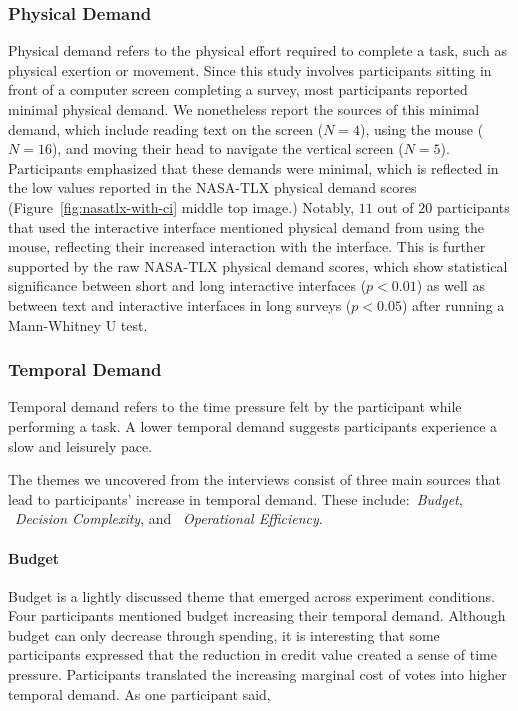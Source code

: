 \subsubsection{Physical Demand} Physical demand refers to the physical effort required to complete a task, such as physical exertion or movement. Since this study involves participants sitting in front of a computer screen completing a survey, most participants reported minimal physical demand. We nonetheless report the sources of this minimal demand, which include reading text on the screen ($N=4$), using the mouse ($N=16$), and moving their head to navigate the vertical screen ($N=5$). Participants emphasized that these demands were minimal, which is reflected in the low values reported in the NASA-TLX physical demand scores (Figure~\ref{fig:nasatlx-with-ci} middle top image.)
Notably, $11$ out of $20$ participants that used the interactive interface mentioned physical demand from using the mouse, reflecting their increased interaction with the interface. This is further supported by the raw NASA-TLX physical demand scores, which show statistical significance between short and long interactive interfaces ($p<0.01$) as well as between text and interactive interfaces in long surveys ($p<0.05$) after running a Mann-Whitney U test.

\subsubsection{Temporal Demand}
Temporal demand refers to the time pressure felt by the participant while performing a task. A lower temporal demand suggests participants experience a slow and leisurely pace.

The themes we uncovered from the interviews consist of three main sources that lead to participants' increase in temporal demand. These include:~\textit{Budget}, ~\textit{Decision Complexity}, and ~\textit{Operational Efficiency}. 

\paragraph{Budget}
Budget is a lightly discussed theme that emerged across experiment conditions. Four participants mentioned budget increasing their temporal demand. Although budget can only decrease through spending, it is interesting that some participants expressed that the reduction in credit value created a sense of time pressure. Participants translated the increasing marginal cost of votes into higher temporal demand. As one participant said,

